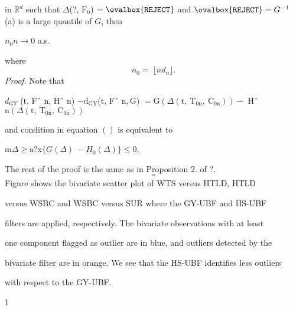 \documentclass[a4paper,12pt]{article}
\begin{document}
in $\mathbb{R}^{d}$ such that $\Delta$(?, $\mathrm{F}_{0}$) $=\ovalbox{\tt\small REJECT}$ and $\ovalbox{\tt\small REJECT}=G^{-1}$ (a) is a large quantile of $G$, then

$n_{0}n \rightarrow 0$ a.s.

where
$$
n_{0}=\ \lfloor nd_{n}\rfloor.
$$
{\it Proof}. Note that

$d_{GY}$ ($\mathrm{t}$, Fˆ $\mathrm{n}$, Hˆ $\mathrm{n}$) $-\mathrm{d}_{\mathrm{G}\mathrm{Y}}$($\mathrm{t}$, Fˆ $\mathrm{n}, \mathrm{G}$) $=\mathrm{G}(\Delta(\mathrm{t},\ \mathrm{T}_{0\mathrm{n}},\ \mathrm{C}_{0\mathrm{n}}))-$ Hˆ $\mathrm{n}(\Delta(\mathrm{t},\ \mathrm{T}_{0\mathrm{n}},\ \mathrm{C}_{0\mathrm{n}}))$

and condition in equation $()$ is equivalent to
\begin{center}
$\mathrm{m}\Delta\geq \mathrm{a}$?$\mathrm{x} \{G(\Delta)\ -H_{0}(\Delta)\}\leq 0,$
\end{center}
The rest of the proof is the same as in Proposition 2. of ?.
$$
\square 
$$
Figure shows the bivariate scatter plot of WTS versus HTLD, HTLD

versus WSBC and WSBC versus SUR where the GY-UBF and HS-UBF

filters are applied, respectively. The bivariate observations with at least

one component flagged as outlier are in blue, and outliers detected by the

bivariate filter are in orange. We see that the HS-UBF identifies less outliers

with respect to the GY-UBF.

1
\end{document}
